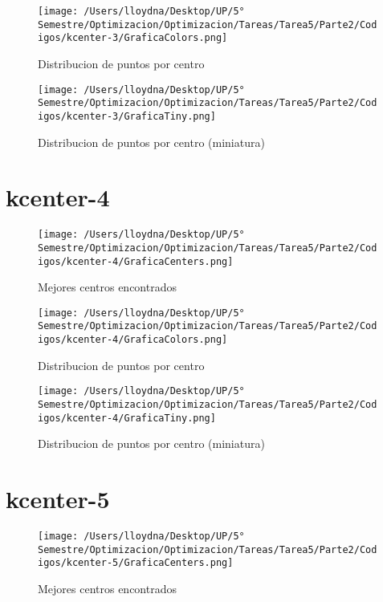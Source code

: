 \documentclass{report}
\begin{document}
        \begin{figure}[H]
            \texttt{[image: /Users/lloydna/Desktop/UP/5° Semestre/Optimizacion/Optimizacion/Tareas/Tarea5/Parte2/Codigos/kcenter-3/GraficaColors.png]}
            \caption{Distribucion de puntos por centro}
            \label{fig:kc32}
        \end{figure}

        \begin{figure}[H]
            \texttt{[image: /Users/lloydna/Desktop/UP/5° Semestre/Optimizacion/Optimizacion/Tareas/Tarea5/Parte2/Codigos/kcenter-3/GraficaTiny.png]}
            \caption{Distribucion de puntos por centro (miniatura)}
            \label{fig:kc33}
        \end{figure}

    \pagebreak

    \section{kcenter-4}
        \begin{figure}[H]
            \texttt{[image: /Users/lloydna/Desktop/UP/5° Semestre/Optimizacion/Optimizacion/Tareas/Tarea5/Parte2/Codigos/kcenter-4/GraficaCenters.png]}
            \caption{Mejores centros encontrados}
            \label{fig:kc41}
        \end{figure}

        \begin{figure}[H]
            \texttt{[image: /Users/lloydna/Desktop/UP/5° Semestre/Optimizacion/Optimizacion/Tareas/Tarea5/Parte2/Codigos/kcenter-4/GraficaColors.png]}
            \caption{Distribucion de puntos por centro}
            \label{fig:kc42}
        \end{figure}

        \begin{figure}[H]
            \texttt{[image: /Users/lloydna/Desktop/UP/5° Semestre/Optimizacion/Optimizacion/Tareas/Tarea5/Parte2/Codigos/kcenter-4/GraficaTiny.png]}
            \caption{Distribucion de puntos por centro (miniatura)}
            \label{fig:kc43}
        \end{figure}

    \pagebreak

    \section{kcenter-5}
        \begin{figure}[H]
            \texttt{[image: /Users/lloydna/Desktop/UP/5° Semestre/Optimizacion/Optimizacion/Tareas/Tarea5/Parte2/Codigos/kcenter-5/GraficaCenters.png]}
            \caption{Mejores centros encontrados}
            \label{fig:kc51}
        \end{figure}
\end{document}
